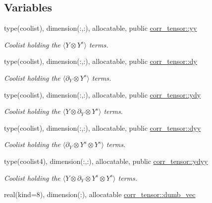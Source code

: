 \subsection*{Variables}
\begin{DoxyCompactItemize}
\item 
type(coolist), dimension(\+:,\+:), allocatable, public \hyperlink{namespacecorr__tensor_a00e5da344c9c6c9326c13bb1006986c7}{corr\+\_\+tensor\+::yy}
\begin{DoxyCompactList}\small\item\em Coolist holding the $\langle Y \otimes Y^s \rangle$ terms. \end{DoxyCompactList}\item 
type(coolist), dimension(\+:,\+:), allocatable, public \hyperlink{namespacecorr__tensor_a9bb5cad0b648cdfbca5d32eac1b73976}{corr\+\_\+tensor\+::dy}
\begin{DoxyCompactList}\small\item\em Coolist holding the $\langle \partial_Y \otimes Y^s \rangle$ terms. \end{DoxyCompactList}\item 
type(coolist), dimension(\+:,\+:), allocatable, public \hyperlink{namespacecorr__tensor_a921f3b41785556ae5502a7ddf0ebf6f6}{corr\+\_\+tensor\+::ydy}
\begin{DoxyCompactList}\small\item\em Coolist holding the $\langle Y \otimes \partial_Y \otimes Y^s \rangle$ terms. \end{DoxyCompactList}\item 
type(coolist), dimension(\+:,\+:), allocatable, public \hyperlink{namespacecorr__tensor_a760409e00ffdf80fe461a8d7fd5c4966}{corr\+\_\+tensor\+::dyy}
\begin{DoxyCompactList}\small\item\em Coolist holding the $\langle \partial_Y \otimes Y^s \otimes Y^s \rangle$ terms. \end{DoxyCompactList}\item 
type(coolist4), dimension(\+:,\+:), allocatable, public \hyperlink{namespacecorr__tensor_a07becc22d3c93783a90fca0e19b7dc2e}{corr\+\_\+tensor\+::ydyy}
\begin{DoxyCompactList}\small\item\em Coolist holding the $\langle Y \otimes \partial_Y \otimes Y^s \otimes Y^s \rangle$ terms. \end{DoxyCompactList}\item 
real(kind=8), dimension(\+:), allocatable \hyperlink{namespacecorr__tensor_ad86b86fa1ec05686a778ab6b19273a38}{corr\+\_\+tensor\+::dumb\+\_\+vec}

\end{DoxyCompactItemize}
